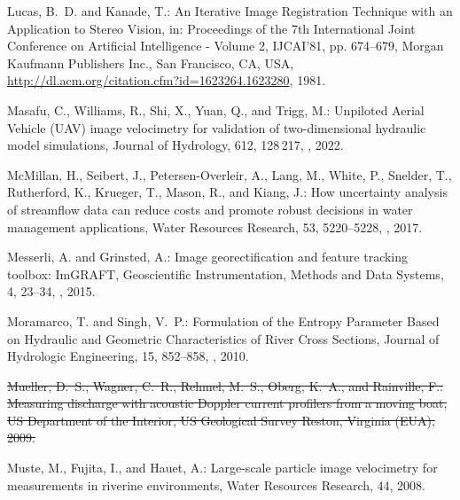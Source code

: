 \documentclass[hess, manuscript]{copernicus} %
\providecommand{\DIFdel}[1]{{\protect\color{red}\sout{#1}}} %
\providecommand{\DIFdelbegin}{} %
\providecommand{\DIFdelend}{} %
\newcommand{\DIFscaledelfig}{0.5}
\newlength{\DIFdelgraphicswidth} %
\newlength{\DIFdelgraphicsheight} %
\newcommand{\DIFdelincludegraphics}[2][]{%
\sbox{\DIFdelgraphicsbox}{\DIFOincludegraphics[#1]{#2}}%
\settoboxwidth{\DIFdelgraphicswidth}{\DIFdelgraphicsbox} %
\settoboxtotalheight{\DIFdelgraphicsheight}{\DIFdelgraphicsbox} %
\scalebox{\DIFscaledelfig}{%
\parbox[b]{\DIFdelgraphicswidth}{\usebox{\DIFdelgraphicsbox}\\[-\baselineskip] \rule{\DIFdelgraphicswidth}{0em}}\llap{\resizebox{\DIFdelgraphicswidth}{\DIFdelgraphicsheight}{%
\setlength{\unitlength}{\DIFdelgraphicswidth}%
\begin{picture}(1,1)%
\thicklines\linethickness{2pt} %
{\color[rgb]{1,0,0}\put(0,0){\framebox(1,1){}}}%
{\color[rgb]{1,0,0}\put(0,0){\line( 1,1){1}}}%
{\color[rgb]{1,0,0}\put(0,1){\line(1,-1){1}}}%
\end{picture}%
}\hspace*{3pt}}} %
} %
\DeclareRobustCommand{\DIFdelbegin}{\DIFOdelbegin \let\includegraphics\DIFdelincludegraphics} %
\DeclareRobustCommand{\DIFdelend}{\DIFOaddend \let\includegraphics\DIFOincludegraphics} %
\begin{document}
\begin{thebibliography}{68}
Lucas, B.~D. and Kanade, T.: An Iterative Image Registration Technique with an
  Application to Stereo Vision, in: Proceedings of the 7th International Joint
  Conference on Artificial Intelligence - Volume 2, IJCAI'81, pp. 674--679,
  Morgan Kaufmann Publishers Inc., San Francisco, CA, USA,
  \urlprefix\url{http://dl.acm.org/citation.cfm?id=1623264.1623280}, 1981.

Masafu, C., Williams, R., Shi, X., Yuan, Q., and Trigg, M.: Unpiloted Aerial
  Vehicle (UAV) image velocimetry for validation of two-dimensional hydraulic
  model simulations, Journal of Hydrology, 612, 128\,217,
  , 2022.

McMillan, H., Seibert, J., Petersen-Overleir, A., Lang, M., White, P., Snelder,
  T., Rutherford, K., Krueger, T., Mason, R., and Kiang, J.: How uncertainty
  analysis of streamflow data can reduce costs and promote robust decisions in
  water management applications, Water Resources Research, 53, 5220--5228,
  , 2017.

Messerli, A. and Grinsted, A.: Image georectification and feature tracking
  toolbox: ImGRAFT, Geoscientific Instrumentation, Methods and Data Systems, 4,
  23--34, , 2015.

Moramarco, T. and Singh, V.~P.: Formulation of the Entropy Parameter Based on
  Hydraulic and Geometric Characteristics of River Cross Sections, Journal of
  Hydrologic Engineering, 15, 852--858,
  , 2010.

\DIFdelbegin {}
\DIFdel{Mueller, D.~S., Wagner, C.~R., Rehmel, M.~S., Oberg, K.~A., and Rainville, F.:
  Measuring discharge with acoustic Doppler current profilers from a moving
  boat, US Department of the Interior, US Geological Survey Reston, Virginia
  (EUA), 2009.
}%

\DIFdelend {}
Muste, M., Fujita, I., and Hauet, A.: Large-scale particle image velocimetry
  for measurements in riverine environments, Water Resources Research, 44,
  2008.


\end{thebibliography}
\end{document}

